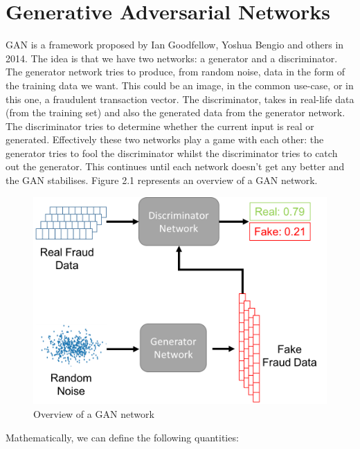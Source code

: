 \documentclass[12pt,a4paper,twoside]{report}
\begin{document}
\section{Generative Adversarial Networks}
GAN is a framework proposed by Ian Goodfellow, Yoshua Bengio and others in 2014. The idea is that we have two networks: a generator and a discriminator. The generator network tries to produce,  from random noise,  data in the form of the training data we want. This could be an image, in the common use-case, or in this one, a fraudulent transaction vector. The discriminator, takes in real-life data (from the training set) and also the generated data from the generator network. The discriminator tries to determine whether the current input is real or generated. Effectively these two networks play a game with each other: the generator tries to fool the discriminator whilst the discriminator tries to catch out the generator. This continues until each network doesn't get any better and the GAN stabilises. Figure 2.1 represents an overview of a GAN network.

\begin{figure}[H]

\centering
\includegraphics[width=\textwidth]{GAN-Overview}
\caption{Overview of a GAN network}
\end{figure}

Mathematically, we can define the following quantities:
\end{document}

